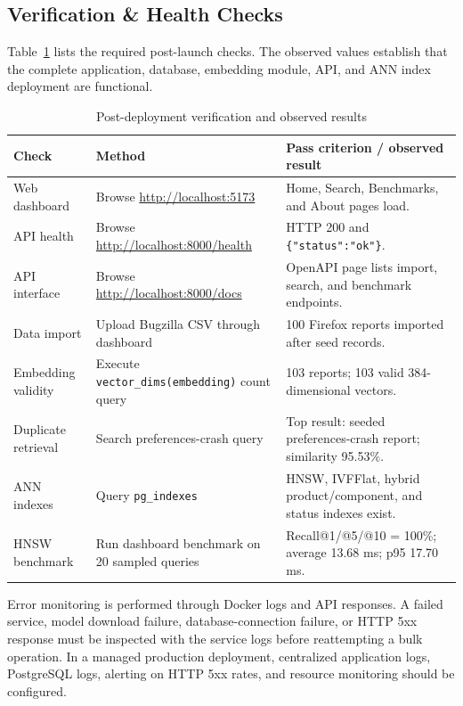 \documentclass[conference]{IEEEtran}
\begin{document}
\subsection{Verification \& Health Checks}
Table~\ref{tab:checks} lists the required post-launch checks. The observed values establish that the complete application, database, embedding module, API, and ANN index deployment are functional.

\begin{table}[!t]
\caption{Post-deployment verification and observed results}
\label{tab:checks}
\centering
\begin{tabular}{p{}p{}p{}}
\toprule
\textbf{Check} & \textbf{Method} & \textbf{Pass criterion / observed result}\\
\midrule
Web dashboard & Browse \url{http://localhost:5173} & Home, Search, Benchmarks, and About pages load.\\
API health & Browse \url{http://localhost:8000/health} & HTTP 200 and \texttt{\{"status":"ok"\}}.\\
API interface & Browse \url{http://localhost:8000/docs} & OpenAPI page lists import, search, and benchmark endpoints.\\
Data import & Upload Bugzilla CSV through dashboard & 100 Firefox reports imported after seed records.\\
Embedding validity & Execute \texttt{vector\_dims(embedding)} count query & 103 reports; 103 valid 384-dimensional vectors.\\
Duplicate retrieval & Search preferences-crash query & Top result: seeded preferences-crash report; similarity 95.53\%.\\
ANN indexes & Query \texttt{pg\_indexes} & HNSW, IVFFlat, hybrid product/component, and status indexes exist.\\
HNSW benchmark & Run dashboard benchmark on 20 sampled queries & Recall@1/@5/@10 = 100\%; average 13.68 ms; p95 17.70 ms.\\
\bottomrule
\end{tabular}
\end{table}

Error monitoring is performed through Docker logs and API responses. A failed service, model download failure, database-connection failure, or HTTP 5xx response must be inspected with the service logs before reattempting a bulk operation. In a managed production deployment, centralized application logs, PostgreSQL logs, alerting on HTTP 5xx rates, and resource monitoring should be configured.
\end{document}
